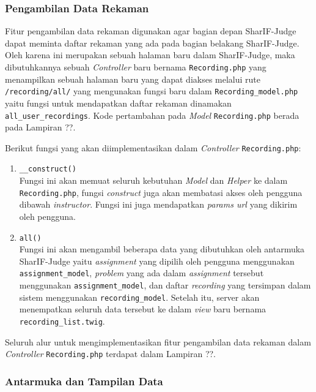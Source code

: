 \subsubsection{Pengambilan Data Rekaman}

Fitur pengambilan data rekaman digunakan agar bagian depan SharIF-Judge dapat meminta daftar rekaman yang ada pada bagian belakang SharIF-Judge. Oleh karena ini merupakan sebuah halaman baru dalam SharIF-Judge, maka dibutuhkannya sebuah \textit{Controller} baru bernama \verb|Recording.php| yang menampilkan sebuah halaman baru yang dapat diakses melalui rute \verb|/recording/all/| yang mengunakan fungsi baru dalam \verb|Recording_model.php| yaitu fungsi untuk mendapatkan daftar rekaman dinamakan \verb|all_user_recordings|. Kode pertambahan pada \textit{Model} \verb|Recording.php| berada pada Lampiran ??.

Berikut fungsi yang akan diimplementasikan dalam \textit{Controller} \verb|Recording.php|:
\begin{enumerate}
    \item \verb|__construct()| \\
    Fungsi ini akan memuat seluruh kebutuhan \textit{Model} dan \textit{Helper} ke dalam \verb|Recording.php|, fungsi \textit{construct} juga akan membatasi akses oleh pengguna dibawah \textit{instructor}. Fungsi ini juga mendapatkan \textit{params url} yang dikirim oleh pengguna. 

    \item \verb|all()| \\
    Fungsi ini akan mengambil beberapa data yang dibutuhkan oleh antarmuka SharIF-Judge yaitu \textit{assignment} yang dipilih oleh pengguna menggunakan \verb|assignment_model|, \textit{problem} yang ada dalam \textit{assignment} tersebut menggunakan \verb|assignment_model|, dan daftar \textit{recording} yang tersimpan dalam sistem menggunakan \verb|recording_model|. Setelah itu, server akan menempatkan seluruh data tersebut ke dalam \textit{view} baru bernama \verb|recording_list.twig|.
\end{enumerate}

Seluruh alur untuk mengimplementasikan fitur pengambilan data rekaman dalam \textit{Controller} \verb|Recording.php| terdapat dalam Lampiran ??.

\subsubsection{Antarmuka dan Tampilan Data}

